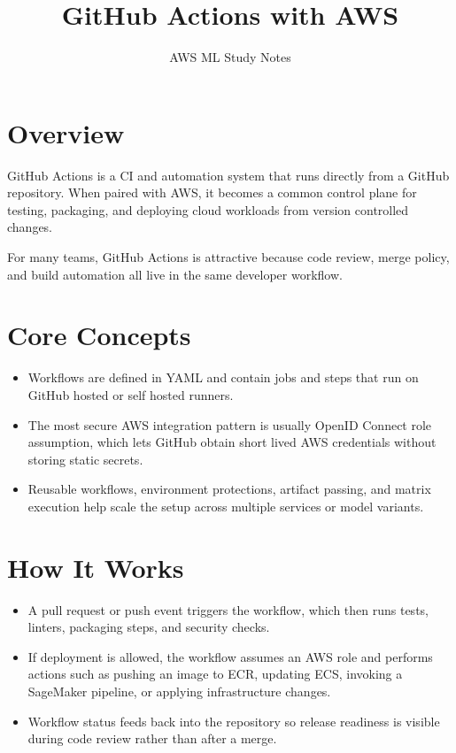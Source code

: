 \documentclass[10pt,twocolumn]{article}
\begin{document}
\title{\vspace{-1.6cm}GitHub Actions with AWS}
\author{AWS ML Study Notes}
\date{}
\maketitle
\small

\section*{Overview}
GitHub Actions is a CI and automation system that runs directly from a GitHub repository. When paired with AWS, it becomes a common control plane for testing, packaging, and deploying cloud workloads from version controlled changes.

For many teams, GitHub Actions is attractive because code review, merge policy, and build automation all live in the same developer workflow.

\section*{Core Concepts}
\begin{itemize}
\item Workflows are defined in YAML and contain jobs and steps that run on GitHub hosted or self hosted runners.
\item The most secure AWS integration pattern is usually OpenID Connect role assumption, which lets GitHub obtain short lived AWS credentials without storing static secrets.
\item Reusable workflows, environment protections, artifact passing, and matrix execution help scale the setup across multiple services or model variants.
\end{itemize}

\section*{How It Works}
\begin{itemize}
\item A pull request or push event triggers the workflow, which then runs tests, linters, packaging steps, and security checks.
\item If deployment is allowed, the workflow assumes an AWS role and performs actions such as pushing an image to ECR, updating ECS, invoking a SageMaker pipeline, or applying infrastructure changes.
\item Workflow status feeds back into the repository so release readiness is visible during code review rather than after a merge.
\end{itemize}
\end{document}
